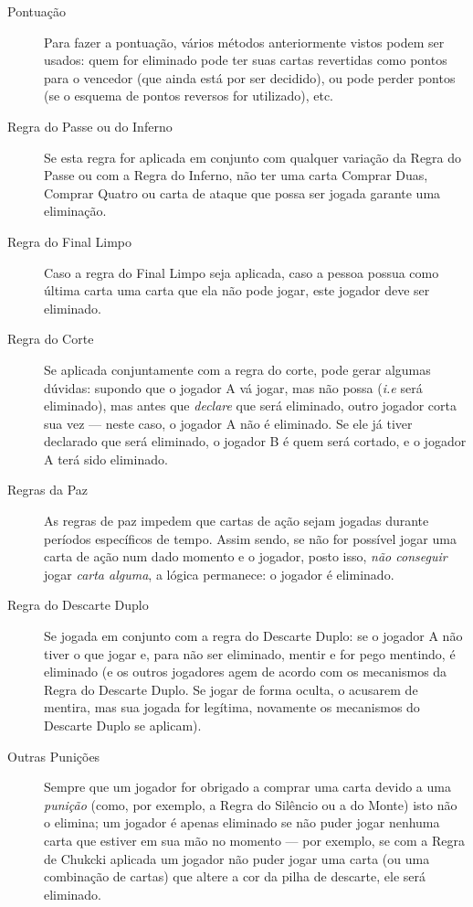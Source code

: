 \begin{description}
\item[Pontuação]{Para fazer a pontuação, vários métodos anteriormente vistos podem ser usados: quem for eliminado pode ter suas cartas revertidas como pontos para o vencedor (que ainda está por ser decidido), ou pode perder pontos (se o esquema de pontos reversos for utilizado), etc.}
\item[Regra do Passe ou do Inferno]{Se esta regra for aplicada em conjunto com qualquer variação da Regra do Passe ou com a Regra do Inferno, não ter uma carta Comprar Duas, Comprar Quatro ou carta de ataque que possa ser jogada garante uma eliminação.}
\item[Regra do Final Limpo]{Caso a regra do Final Limpo seja aplicada, caso a pessoa possua como última carta uma carta que ela não pode jogar, este jogador deve ser eliminado.}
\item[Regra do Corte]{Se aplicada conjuntamente com a regra do corte, pode gerar algumas dúvidas: supondo que o jogador A vá jogar, mas não possa (\emph{i.e} será eliminado), mas antes que \emph{declare} que será eliminado, outro jogador corta sua vez --- neste caso, o jogador A não é eliminado. Se ele já tiver declarado que será eliminado, o jogador B é quem será cortado, e o jogador A terá sido eliminado.}
\item[Regras da Paz]{As regras de paz impedem que cartas de ação sejam jogadas durante períodos específicos de tempo. Assim sendo, se não for possível jogar uma carta de ação num dado momento e o jogador, posto isso, \emph{não conseguir} jogar \emph{carta alguma}, a lógica permanece: o jogador é eliminado.}
\item[Regra do Descarte Duplo]{Se jogada em conjunto com a regra do Descarte Duplo: se o jogador A não tiver o que jogar e, para não ser eliminado, mentir e for pego mentindo, é eliminado (e os outros jogadores agem de acordo com os mecanismos da Regra do Descarte Duplo. Se jogar de forma oculta, o acusarem de mentira, mas sua jogada for legítima, novamente os mecanismos do Descarte Duplo se aplicam).}
\item[Outras Punições]{Sempre que um jogador for obrigado a comprar uma carta devido a uma \emph{punição} (como, por exemplo, a Regra do Silêncio ou a do Monte) isto não o elimina; um jogador é apenas eliminado se não puder jogar nenhuma carta que estiver em sua mão no momento --- por exemplo, se com a Regra de Chukcki aplicada um jogador não puder jogar uma carta (ou uma combinação de cartas) que altere a cor da pilha de descarte, ele será eliminado.}
\end{description}

